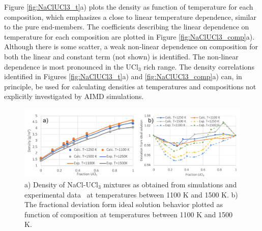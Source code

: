 \documentclass[titlepage=firstiscover,11pt,fleqn,headheight=14pt,footheight=40.8pt]{scrreprt}
\begin{document}

Figure \ref{fig:NaClUCl3_t}a) plots the density as function of temperature for each composition, which emphasizes a close to linear temperature dependence, similar to the pure end-members. %
The coefficients describing the linear dependence on temperature for each composition are plotted in Figure \ref{fig:NaClUCl3_comp}a). Although there is some scatter, a weak non-linear dependence on composition for both the linear and constant term (not shown) is identified. The non-linear dependence is most pronounced in the UCl$_3$ rich range.  
The density correlations identified in Figures \ref{fig:NaClUCl3_t}a) and \ref{fig:NaClUCl3_comp}a) can, in principle, be used for calculating densities at temperatures and compositions not explicitly investigated by AIMD simulations. %

\begin{figure}[htb]
\centering
\includegraphics[width=1.00\textwidth]{FIG6.pdf}
\caption{a) Density of NaCl-UCl$_3$ mixtures as obtained from simulations and experimental data~\cite{Desyatnik} at temperatures between 1100 K and 1500 K. %
b) The fractional deviation form ideal solution behavior plotted as function of composition at temperatures between 1100 K and 1500 K. %
} 
\label{fig:NaClUCl3}
\end{figure}
\end{document}
